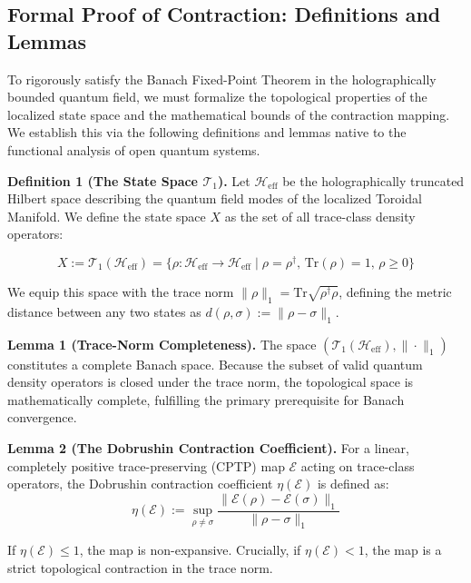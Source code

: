 \documentclass[12pt,openany]{book}
\theoremstyle{plain}
\theoremstyle{definition}
\theoremstyle{remark}
\begin{document}
\subsection{Formal Proof of Contraction: Definitions and Lemmas}

To rigorously satisfy the Banach Fixed-Point Theorem in the holographically bounded quantum field, we must formalize the topological properties of the localized state space and the mathematical bounds of the contraction mapping. We establish this via the following definitions and lemmas native to the functional analysis of open quantum systems.

\textbf{Definition 1 (The State Space $\mathcal{T}_1$).} Let $\mathcal{H}_{\text{eff}}$ be the holographically truncated Hilbert space describing the quantum field modes of the localized Toroidal Manifold. We define the state space $X$ as the set of all trace-class density operators:

$$X := \mathcal{T}_1(\mathcal{H}_{\text{eff}}) = \{ \rho : \mathcal{H}_{\text{eff}} \to \mathcal{H}_{\text{eff}} \mid \rho = \rho^\dagger, \, \text{Tr}(\rho) = 1, \, \rho \ge 0 \}$$

We equip this space with the trace norm $\|\rho\|_1 = \text{Tr}\sqrt{\rho^\dagger\rho}$, defining the metric distance between any two states as $d(\rho, \sigma) := \|\rho - \sigma\|_1$.

\textbf{Lemma 1 (Trace-Norm Completeness).} The space $(\mathcal{T}_1(\mathcal{H}_{\text{eff}}), \|\cdot\|_1)$ constitutes a complete Banach space. Because the subset of valid quantum density operators is closed under the trace norm, the topological space is mathematically complete, fulfilling the primary prerequisite for Banach convergence.

\textbf{Lemma 2 (The Dobrushin Contraction Coefficient).} For a linear, completely positive trace-preserving (CPTP) map $\mathcal{E}$ acting on trace-class operators, the Dobrushin contraction coefficient $\eta(\mathcal{E})$ is defined as:
$$\eta(\mathcal{E}) := \sup_{\rho \ne \sigma} \frac{\|\mathcal{E}(\rho) - \mathcal{E}(\sigma)\|_1}{\|\rho - \sigma\|_1}$$

If $\eta(\mathcal{E}) \le 1$, the map is non-expansive. Crucially, if $\eta(\mathcal{E}) < 1$, the map is a strict topological contraction in the trace norm.
\end{document}
